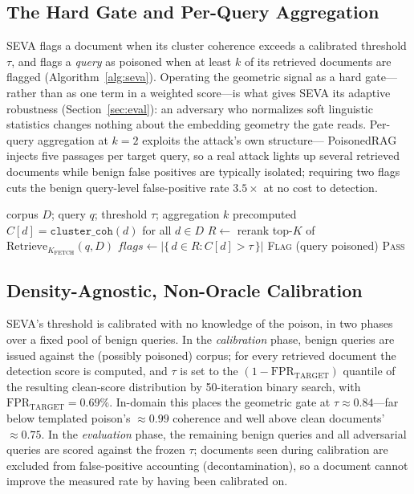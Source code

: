 \documentclass[10pt,journal,compsoc]{IEEEtran}
\begin{document}
\subsection{The Hard Gate and Per-Query Aggregation}
SEVA flags a document when its cluster coherence exceeds a calibrated threshold
$\tau$, and flags a \emph{query} as poisoned when at least $k$ of its retrieved
documents are flagged (Algorithm~\ref{alg:seva}). Operating the geometric signal
as a hard gate---rather than as one term in a weighted score---is what gives SEVA
its adaptive robustness (Section~\ref{sec:eval}): an adversary who normalizes soft
linguistic statistics changes nothing about the embedding geometry the gate
reads. Per-query aggregation at $k=2$ exploits the attack's own structure---%
PoisonedRAG injects five passages per target query, so a real attack
lights up several retrieved documents while benign false positives are typically
isolated; requiring two flags cuts the benign query-level false-positive rate
$3.5\times$ at no cost to detection.

\begin{algorithm}[t]
\caption{SEVA detection (\texttt{cluster\_coh} hard gate)}
\label{alg:seva}
\begin{algorithmic}[1]
\REQUIRE corpus $D$; query $q$; threshold $\tau$; aggregation $k$
\REQUIRE precomputed $C[d]=\texttt{cluster\_coh}(d)$ for all $d\in D$
\STATE $R \leftarrow$ rerank top-$K$ of $\mathrm{Retrieve}_{K_{\mathrm{FETCH}}}(q, D)$
\STATE $\mathit{flags} \leftarrow \big|\{\, d \in R : C[d] > \tau \,\}\big|$
\RETURN \textsc{Flag} \quad (query poisoned)
\ELSE
\RETURN \textsc{Pass}
\ENDIF
\end{algorithmic}
\end{algorithm}

\subsection{Density-Agnostic, Non-Oracle Calibration}
SEVA's threshold is calibrated with no knowledge of the poison, in two phases over
a fixed pool of benign queries. In the \emph{calibration} phase, benign queries are
issued against the (possibly poisoned) corpus; for every retrieved document the
detection score is computed, and $\tau$ is set to the
$(1-\mathrm{FPR}_{\mathrm{TARGET}})$ quantile of the resulting clean-score
distribution by 50-iteration binary search, with
$\mathrm{FPR}_{\mathrm{TARGET}}=0.69\%$. In-domain this places the geometric gate at
$\tau\approx0.84$---far below templated poison's $\approx\!0.99$ coherence and well
above clean documents' $\approx\!0.75$. In the \emph{evaluation} phase, the
remaining benign queries and all adversarial queries are scored against the frozen
$\tau$; documents seen during calibration are excluded from false-positive
accounting (decontamination), so a document cannot improve the measured rate by
having been calibrated on.
\end{document}
